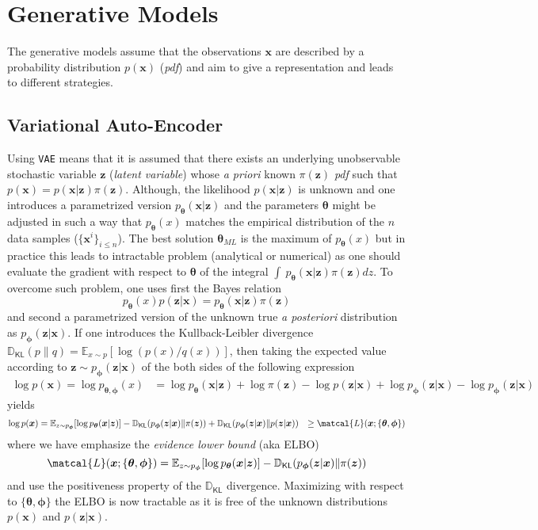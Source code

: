 \documentclass[11pt]{amsart}
\newcommand{\Esp}[0]{\ensuremath{\mathbb{E}}}
\newcommand{\DKL}[0]{\ensuremath{\mathbb{D}_{\mathsf{KL}}}}
\begin{document}
\section{Generative Models}
%
The generative models assume that the observations $\bm{x}$ are described by a probability distribution $p(\bm{x})$ (\textit{pdf}) and aim to give a representation and leads to different strategies.
%
\subsection{Variational Auto-Encoder}
%
Using \texttt{VAE} means that it is assumed that there exists an underlying unobservable stochastic variable $\bm{z}$  (\textit{latent variable}) whose \textit{a priori} known $\pi(\bm{z})$ \textit{pdf} such that $p(\bm{x}) = p(\bm{x}|\bm{z})\pi(\bm{z})$. Although, the likelihood  $p(\bm{x}|\bm{z})$ is unknown and one introduces a parametrized version $p_{\bm{\theta}}(\bm{x}|\bm{z})$ and the parameters $\bm{\theta}$ might be adjusted in such a way that  $p_{\bm{\theta}}(x)$ matches the empirical distribution of the $n$ data samples ($\{\bm{x}^{i}\}_{i\leq n}$). The best solution $\bm{\theta}_{ML}$ is the maximum of $p_{\bm{\theta}}(x)$ but in practice this leads to  intractable problem (analytical or numerical) as one should evaluate the gradient with respect to $\bm{\theta}$ of the integral 
$\int\ p_{\bm{\theta}}(\bm{x}|\bm{z})\pi(\bm{z}) dz$. To overcome such problem, one uses first the Bayes relation
\begin{equation}
p_{\bm{\theta}}(x) p(\bm{z}|\bm{x}) = p_{\bm{\theta}}(\bm{x}|\bm{z}) \pi(\bm{z})
\end{equation}
and second a parametrized version of the unknown true \textit{a posteriori} distribution as $p_{\bm{\phi}}(\bm{z}|\bm{x})$. If one introduces the Kullback-Leibler divergence $\DKL(p\| q)=\Esp_{x\sim p}[\log(p(x)/q(x))]$, then taking the expected value according to $\bm{z}\sim p_{\bm{\phi}}(\bm{z}|\bm{x})$ of the both sides of the following expression
\begin{align}
\log p(\bm{x}) = \log p_{\bm{\theta},\bm{\phi}}(x) &= \log p_{\bm{\theta}}(\bm{x}|\bm{z}) + \log \pi(\bm{z}) - \log p(\bm{z}|\bm{x}) + \log p_{\bm{\phi}}(\bm{z}|\bm{x}) - \log p_{\bm{\phi}}(\bm{z}|\bm{x})
\end{align}
yields 
\begin{align}
\log p(\bm{x})  &= \Esp_{z\sim p_{\bm{\phi}}}[\log p_{\bm{\theta}}(\bm{x}|\bm{z})] - \DKL(p_{\bm{\phi}}(\bm{z}|\bm{x})\| \pi(\bm{z})) + \DKL(p_{\bm{\phi}}(\bm{z}|\bm{x})\| p(\bm{z}|\bm{x}))
&\geq \matcal{L}(\bm{x};\{\bm{\theta},\bm{\phi}\})
\end{align}
where we have emphasize the \textit{evidence lower bound} (aka ELBO)
\begin{equation}
\matcal{L}(\bm{x};\{\bm{\theta},\bm{\phi}\}) = \Esp_{z\sim p_{\bm{\phi}}}[\log p_{\bm{\theta}}(\bm{x}|\bm{z})] - \DKL(p_{\bm{\phi}}(\bm{z}|\bm{x})\| \pi(\bm{z}))
\end{equation}
and use the positiveness property of the $\DKL$ divergence. Maximizing with respect to 
$\{\bm{\theta},\bm{\phi}\}$ the ELBO is now tractable as it is free of the unknown distributions $p(\bm{x})$ and $p(\bm{z}|\bm{x})$.
\end{document}
